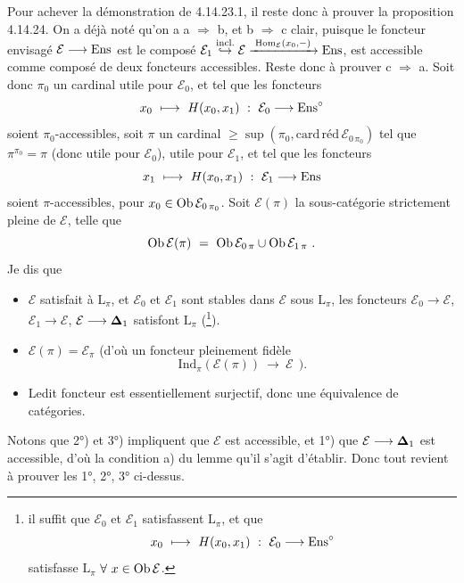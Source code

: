 Pour achever la démonstration de 4.14.23.1, il reste donc à prouver la proposition 4.14.24. On a déjà noté qu'on a a $\Longrightarrow$ b, et b $\Longrightarrow$ c clair, puisque le foncteur envisagé $\mathcal{E}\longrightarrow\mathrm{Ens}$ est le composé $\mathcal{E}_1\overset{\text{incl.}}{\hookrightarrow}\mathcal{E}\xrightarrow{\;\operatorname{Hom}_{\mathcal{E}}(x_0,-)\;}\mathrm{Ens}$, est accessible comme composé de deux
foncteurs accessibles. Reste donc à prouver c $\Longrightarrow$ a. Soit donc $\pi_0$ un cardinal utile pour $\mathcal{E}_0$, et tel que les foncteurs
\[
x_0\ \longmapsto\ H(x_0,x_1)\ :\ \mathcal{E}_0\longrightarrow\Ens^{\circ}
\]
soient $\pi_0$-accessibles, soit $\pi$ un cardinal $\geqslant\sup(\pi_0,\mathrm{card}\,\text{réd}\,\mathcal{E}_{0\,\pi_0})$ tel que $\pi^{\pi_0}=\pi$ (donc utile pour $\mathcal{E}_0$), utile pour $\mathcal{E}_1$, et tel que les foncteurs
\[
x_1\ \longmapsto\ H(x_0,x_1)\ :\ \mathcal{E}_1\longrightarrow\Ens
\]
soient $\pi$-accessibles, pour $x_0\in\operatorname{Ob}\mathcal{E}_{0\,\pi_0}$. Soit $\mathcal{E}(\pi)$ la sous-catégorie strictement pleine de $\mathcal{E}$, telle que
\[
\Ob\mathcal{E}(\pi)\ =\ \Ob\mathcal{E}_{0\,\pi}\cup\Ob\mathcal{E}_{1\,\pi}\ .
\]
Je dis que
\begin{itemize}[leftmargin=*]
\item[1°)] $\mathcal{E}$ satisfait à $\mathrm{L}_\pi$, et $\mathcal{E}_0$ et $\mathcal{E}_1$ sont stables dans $\mathcal{E}$ sous $\mathrm{L}_\pi$, les foncteurs $\mathcal{E}_0\longrightarrow\mathcal{E}$, $\mathcal{E}_1\longrightarrow\mathcal{E}$, $\mathcal{E}\longrightarrow\boldsymbol{\Delta}_1$ satisfont $\mathrm{L}_\pi$ (\footnote[174]{il suffit que $\mathcal{E}_0$ et $\mathcal{E}_1$ satisfassent $\mathrm{L}_\pi$, et que
\[
x_0\ \longmapsto\ H(x_0,x_1)\ :\ \mathcal{E}_0\longrightarrow\Ens^{\circ}
\]
satisfasse $\mathrm{L}_\pi$ $\forall\ x\in\operatorname{Ob}\mathcal{E}$.}).
\item[2°)] $\mathcal{E}(\pi)=\mathcal{E}_\pi$ (d'où un foncteur pleinement fidèle
\[
\mathrm{Ind}_\pi(\mathcal{E}(\pi))\ \longrightarrow\ \mathcal{E}\ \ ).
\]
\item[3°)] Ledit foncteur est essentiellement surjectif,
donc une équivalence de catégories.
\end{itemize}
Notons que 2°) et 3°) impliquent que $\mathcal{E}$ est accessible, et 1°) que $\mathcal{E}\longrightarrow\boldsymbol{\Delta}_1$ est accessible, d'où la condition a) du lemme qu'il s'agit d'établir. Donc tout revient à prouver les 1°, 2°, 3° ci-dessus.

